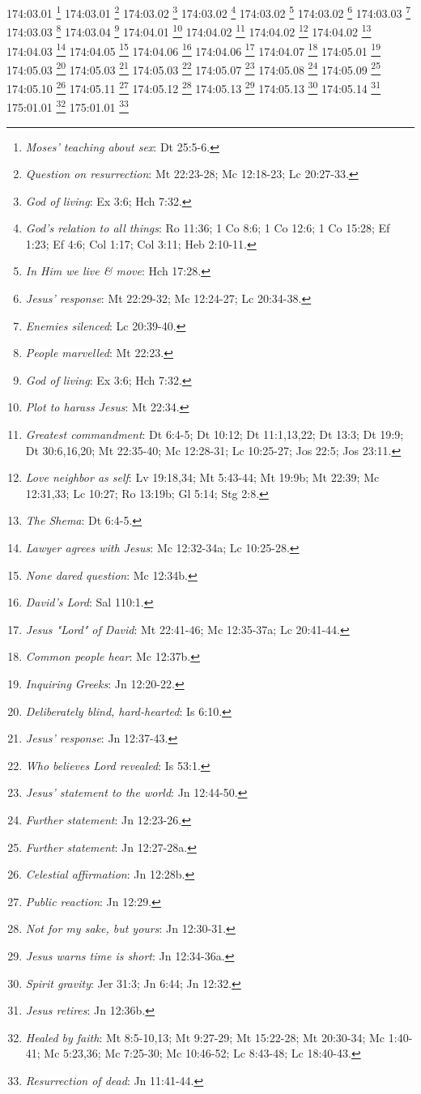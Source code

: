 {{{{{{{{{{{{{{{{{{{{{{{{{{{{{{{{{{{{{{{{{{{{{{{{{{{{{{{{{{{{{{{{174:03.01 \footnote{\textit{Moses' teaching about sex}: Dt 25:5-6.}
174:03.01 \footnote{\textit{Question on resurrection}: Mt 22:23-28; Mc 12:18-23; Lc 20:27-33.}
174:03.02 \footnote{\textit{God of living}: Ex 3:6; Hch 7:32.}
174:03.02 \footnote{\textit{God's relation to all things}: Ro 11:36; 1 Co 8:6; 1 Co 12:6; 1 Co 15:28; Ef 1:23; Ef 4:6; Col 1:17; Col 3:11; Heb 2:10-11.}
174:03.02 \footnote{\textit{In Him we live & move}: Hch 17:28.}
174:03.02 \footnote{\textit{Jesus' response}: Mt 22:29-32; Mc 12:24-27; Lc 20:34-38.}
174:03.03 \footnote{\textit{Enemies silenced}: Lc 20:39-40.}
174:03.03 \footnote{\textit{People marvelled}: Mt 22:23.}
174:03.04 \footnote{\textit{God of living}: Ex 3:6; Hch 7:32.}
174:04.01 \footnote{\textit{Plot to harass Jesus}: Mt 22:34.}
174:04.02 \footnote{\textit{Greatest commandment}: Dt 6:4-5; Dt 10:12; Dt 11:1,13,22; Dt 13:3; Dt 19:9; Dt 30:6,16,20; Mt 22:35-40; Mc 12:28-31; Lc 10:25-27; Jos 22:5; Jos 23:11.}
174:04.02 \footnote{\textit{Love neighbor as self}: Lv 19:18,34; Mt 5:43-44; Mt 19:9b; Mt 22:39; Mc 12:31,33; Lc 10:27; Ro 13:19b; Gl 5:14; Stg 2:8.}
174:04.02 \footnote{\textit{The Shema}: Dt 6:4-5.}
174:04.03 \footnote{\textit{Lawyer agrees with Jesus}: Mc 12:32-34a; Lc 10:25-28.}
174:04.05 \footnote{\textit{None dared question}: Mc 12:34b.}
174:04.06 \footnote{\textit{David's Lord}: Sal 110:1.}
174:04.06 \footnote{\textit{Jesus "Lord" of David}: Mt 22:41-46; Mc 12:35-37a; Lc 20:41-44.}
174:04.07 \footnote{\textit{Common people hear}: Mc 12:37b.}
174:05.01 \footnote{\textit{Inquiring Greeks}: Jn 12:20-22.}
174:05.03 \footnote{\textit{Deliberately blind, hard-hearted}: Is 6:10.}
174:05.03 \footnote{\textit{Jesus' response}: Jn 12:37-43.}
174:05.03 \footnote{\textit{Who believes Lord revealed}: Is 53:1.}
174:05.07 \footnote{\textit{Jesus' statement to the world}: Jn 12:44-50.}
174:05.08 \footnote{\textit{Further statement}: Jn 12:23-26.}
174:05.09 \footnote{\textit{Further statement}: Jn 12:27-28a.}
174:05.10 \footnote{\textit{Celestial affirmation}: Jn 12:28b.}
174:05.11 \footnote{\textit{Public reaction}: Jn 12:29.}
174:05.12 \footnote{\textit{Not for my sake, but yours}: Jn 12:30-31.}
174:05.13 \footnote{\textit{Jesus warns time is short}: Jn 12:34-36a.}
174:05.13 \footnote{\textit{Spirit gravity}: Jer 31:3; Jn 6:44; Jn 12:32.}
174:05.14 \footnote{\textit{Jesus retires}: Jn 12:36b.}
175:01.01 \footnote{\textit{Healed by faith}: Mt 8:5-10,13; Mt 9:27-29; Mt 15:22-28; Mt 20:30-34; Mc 1:40-41; Mc 5:23,36; Mc 7:25-30; Mc 10:46-52; Lc 8:43-48; Lc 18:40-43.}
175:01.01 \footnote{\textit{Resurrection of dead}: Jn 11:41-44.}
}}}}}}}}}}}}}}}}}}}}}}}}}}}}}}}}}}}}}}}}}}}}}}}}}}}}}}}}}}}}}}}}
